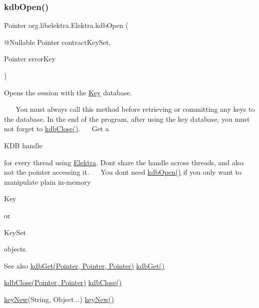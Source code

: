 \subsubsection{\texorpdfstring{kdb\+Open()}{kdbOpen()}}
{\footnotesize\ttfamily Pointer org.\+libelektra.\+Elektra.\+kdb\+Open (\begin{DoxyParamCaption}\item[{@Nullable Pointer}]{contract\+Key\+Set,  }\item[{Pointer}]{error\+Key }\end{DoxyParamCaption})}



Opens the session with the \hyperlink{classorg_1_1libelektra_1_1Key}{Key} database. 

~\newline
 ~\newline
 You must always call this method before retrieving or committing any keys to the database. In the end of the program, after using the key database, you must not forget to \hyperlink{interfaceorg_1_1libelektra_1_1Elektra_a60cf0c7cefd0a6a34b4608bdc5eded4b}{kdb\+Close()}.~\newline
 ~\newline
 Get a
\begin{DoxyCode}
KDB handle 
\end{DoxyCode}
 for every thread using \hyperlink{interfaceorg_1_1libelektra_1_1Elektra}{Elektra}. Don\textquotesingle{}t share the handle across threads, and also not the pointer accessing it.~\newline
 ~\newline
 You don\textquotesingle{}t need \hyperlink{}{kdb\+Open()} if you only want to manipulate plain in-\/memory 
\begin{DoxyCode}
Key 
\end{DoxyCode}
 or
\begin{DoxyCode}
KeySet 
\end{DoxyCode}
 objects.

\begin{DoxySeeAlso}{See also}
\hyperlink{interfaceorg_1_1libelektra_1_1Elektra_a09ad2a446a215b6cce4cfb31d9871ac2}{kdb\+Get(\+Pointer, Pointer, Pointer)} \hyperlink{interfaceorg_1_1libelektra_1_1Elektra_a09ad2a446a215b6cce4cfb31d9871ac2}{kdb\+Get()} 

\hyperlink{interfaceorg_1_1libelektra_1_1Elektra_a60cf0c7cefd0a6a34b4608bdc5eded4b}{kdb\+Close(\+Pointer, Pointer)} \hyperlink{interfaceorg_1_1libelektra_1_1Elektra_a60cf0c7cefd0a6a34b4608bdc5eded4b}{kdb\+Close()} 

\hyperlink{interfaceorg_1_1libelektra_1_1Elektra_ae437441010a3a634a39107e37808cbd1}{key\+New}(String, Object...) \hyperlink{interfaceorg_1_1libelektra_1_1Elektra_ae437441010a3a634a39107e37808cbd1}{key\+New()}
\end{DoxySeeAlso}

